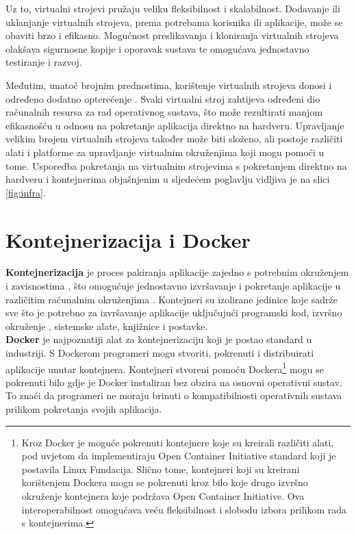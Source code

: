 \documentclass[times, utf8, diplomski]{fer}
\begin{document}
Uz to, virtualni strojevi pružaju veliku fleksibilnost i skalabilnost. Dodavanje ili uklanjanje virtualnih strojeva, prema potrebama korisnika ili aplikacije, može se obaviti brzo i efikasno. Mogućnost preslikavanja  i kloniranja  virtualnih strojeva olakšava sigurnosne kopije  i oporavak sustava te omogućava jednostavno testiranje i razvoj.

Međutim, unatoč brojnim prednostima, korištenje virtualnih strojeva donosi i određeno dodatno opterećenje . Svaki virtualni stroj zahtijeva određeni dio računalnih resursa za rad operativnog sustava, što može rezultirati manjom efikasnošću u odnosu na pokretanje aplikacija direktno na hardveru. Upravljanje velikim brojem virtualnih strojeva također može biti složeno, ali postoje različiti alati i platforme za upravljanje virtualnim okruženjima koji mogu pomoći u tome. Usporedba pokretanja na virtualnim strojevima s pokretanjem direktno na hardveru i kontejnerima objašnjenim u sljedećem poglavlju vidljiva je na slici \ref{fig:infra}.

\section{Kontejnerizacija i Docker}
\label{sec:docker}

\textbf{Kontejnerizacija}  je proces pakiranja aplikacije zajedno s potrebnim okruženjem i zavisnostima , što omogućuje jednostavno izvršavanje i pokretanje aplikacije u različitim računalnim okruženjima \citep{red_hat_what_2021}. Kontejneri su izolirane jedinice koje sadrže sve što je potrebno za izvršavanje aplikacije uključujući programski kod, izvršno okruženje , sistemske alate, knjižnice  i postavke. \\

\textbf{Docker} je najpoznatiji alat za kontejnerizaciju koji je postao standard u industriji. S Dockerom programeri mogu stvoriti, pokrenuti i distribuirati aplikacije unutar kontejnera. Kontejneri stvoreni pomoću Dockera\footnote{Kroz Docker je moguće pokrenuti kontejnere koje su kreirali različiti alati, pod uvjetom da implementiraju Open Container Initiative standard koji je postavila Linux Fundacija. Slično tome, kontejneri koji su kreirani korištenjem Dockera mogu se pokrenuti kroz bilo koje drugo izvršno okruženje kontejnera koje podržava Open Container Initiative. Ova interoperabilnost omogućava veću fleksibilnost i slobodu izbora prilikom rada s kontejnerima.} mogu se pokrenuti bilo gdje je Docker instaliran bez obzira na osnovni operativni sustav. To znači da programeri ne moraju brinuti o kompatibilnosti operativnih sustava prilikom pokretanja svojih aplikacija.
\end{document}
